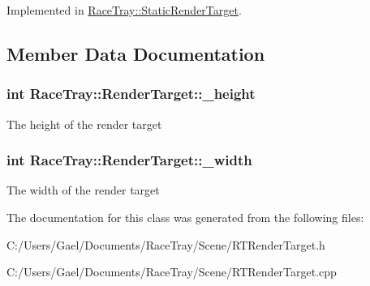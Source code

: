 Implemented in \hyperlink{class_race_tray_1_1_static_render_target_a4f7bf1080af87d6b64e40771adac1861}{Race\-Tray\-::\-Static\-Render\-Target}.



\subsection{Member Data Documentation}
\hypertarget{class_race_tray_1_1_render_target_af3c0dcb0091c5c5be2b3350fa8dce79b}{
\subsubsection[{\-\_\-height}]{\setlength{\rightskip}{0pt plus 5cm}int Race\-Tray\-::\-Render\-Target\-::\-\_\-height\hspace{0.3cm}{\ttfamily [protected]}}}\label{class_race_tray_1_1_render_target_af3c0dcb0091c5c5be2b3350fa8dce79b}
The height of the render target \hypertarget{class_race_tray_1_1_render_target_a26912f27dd5d06467d2144049610057d}{
\subsubsection[{\-\_\-width}]{\setlength{\rightskip}{0pt plus 5cm}int Race\-Tray\-::\-Render\-Target\-::\-\_\-width\hspace{0.3cm}{\ttfamily [protected]}}}\label{class_race_tray_1_1_render_target_a26912f27dd5d06467d2144049610057d}
The width of the render target 

The documentation for this class was generated from the following files\-:\begin{DoxyCompactItemize}
\item 
C\-:/\-Users/\-Gael/\-Documents/\-Race\-Tray/\-Scene/R\-T\-Render\-Target.\-h\item 
C\-:/\-Users/\-Gael/\-Documents/\-Race\-Tray/\-Scene/R\-T\-Render\-Target.\-cpp\end{DoxyCompactItemize}
